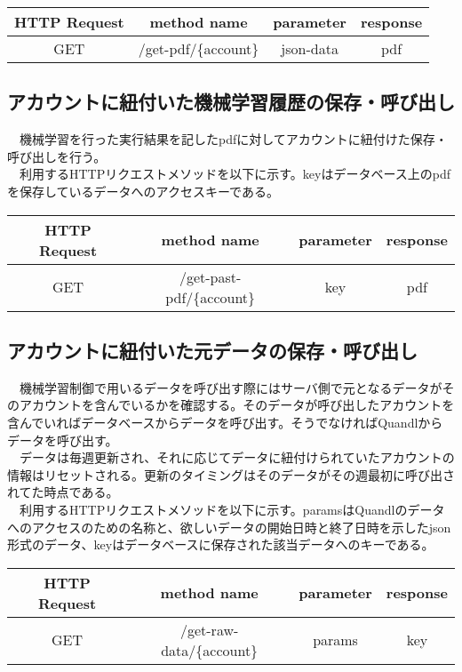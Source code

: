 \documentclass{scrartcl}
\begin{document}
\begin{center}
\begin{tabular}{|c|c|c|c|}
\hline
HTTP Request & method name & parameter & response\\
\hline
GET & /get-pdf/\{account\} & json-data & pdf\\
\hline
\end{tabular}
\end{center}

\subsection{アカウントに紐付いた機械学習履歴の保存・呼び出し}
\label{sec:orgacd42be}
　機械学習を行った実行結果を記したpdfに対してアカウントに紐付けた保存・呼び出しを行う。\\
　利用するHTTPリクエストメソッドを以下に示す。keyはデータベース上のpdfを保存しているデータへのアクセスキーである。\\

\begin{center}
\begin{tabular}{|c|c|c|c|}
\hline
HTTP Request & method name & parameter & response\\
\hline
GET & /get-past-pdf/\{account\} & key & pdf\\
\hline
\end{tabular}
\end{center}

\subsection{アカウントに紐付いた元データの保存・呼び出し}
\label{sec:org6015e31}
　機械学習制御で用いるデータを呼び出す際にはサーバ側で元となるデータがそのアカウントを含んでいるかを確認する。そのデータが呼び出したアカウントを含んでいればデータベースからデータを呼び出す。そうでなければQuandlからデータを呼び出す。\\
　データは毎週更新され、それに応じてデータに紐付けられていたアカウントの情報はリセットされる。更新のタイミングはそのデータがその週最初に呼び出されてた時点である。\\
　利用するHTTPリクエストメソッドを以下に示す。paramsはQuandlのデータへのアクセスのための名称と、欲しいデータの開始日時と終了日時を示したjson形式のデータ、keyはデータベースに保存された該当データへのキーである。\\

\begin{center}
\begin{tabular}{|c|c|c|c|}
\hline
HTTP Request & method name & parameter & response\\
\hline
GET & /get-raw-data/\{account\} & params & key\\
\hline
\end{tabular}
\end{center}
\end{document}
